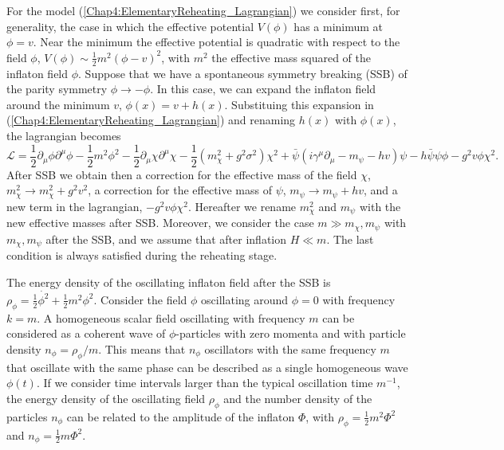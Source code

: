 \documentclass[11pt,a4paper,twoside]{book}
\begin{document}
For the model (\ref{Chap4:ElementaryReheating_Lagrangian}) we consider first, for generality, the case in which the effective potential $ V(\phi) $ has a minimum at $ \phi = v $. Near the minimum the effective potential  is quadratic with respect to the field $\phi$, $ V(\phi) \sim \frac{1}{2}m^{2}(\phi-v)^{2} $, with $ m^{2} $ the effective mass squared of the inflaton field $\phi$. Suppose that we have a spontaneous symmetry breaking (SSB) of the parity symmetry $ \phi  \rightarrow -\phi$. In this case, we can expand the inflaton field around the minimum $ v $, $ \phi(x)=v + h(x)  $. Substituing this expansion in (\ref{Chap4:ElementaryReheating_Lagrangian}) and renaming $ h(x) $ with $\phi(x)$, the lagrangian becomes
\begin{equation}
	\label{Chap4:ElementaryReheating_LafterSSB}
	\mathcal{L}=\frac{1}{2}\partial_{\mu}\phi\partial^{\mu}\phi -\frac{1}{2}m^{2}\phi^{2} - \frac{1}{2}\partial_{\mu}\chi\partial^{\mu}\chi -\frac{1}{2}(m^{2}_{\chi} +g^{2}\sigma^{2})\chi^{2} + \bar{\psi}(i\gamma^{\mu}\partial_{\mu} - m_{\psi} - hv )\psi  - h\bar{\psi}\psi\phi -g^{2}v\phi\chi^{2}.
\end{equation}
After SSB we obtain then a correction for the effective mass of the field $\chi$, $ m^{2}_{\chi} \rightarrow m^{2}_{\chi}+g^{2}v^{2} $, a correction for the effective mass of $\psi$, $ m_{\psi} \rightarrow m_{\psi} + hv $, and a new term in the lagrangian, $ -g^{2}v\phi \chi^{2} $. Hereafter we rename $ m^{2}_{\chi} $ and $ m_{\psi} $ with the new effective masses after SSB. Moreover, we consider the case $ m \gg m_{\chi}, m_{\psi} $ with $ m_{\chi},m_{\psi} $ after the SSB, and we assume that after inflation $ H \ll m $. The last condition is always satisfied during the reheating stage.

The energy density of the oscillating inflaton field after the SSB is $ \rho_{\phi} = \frac{1}{2}\dot{\phi^{2}} + \frac{1}{2}m^{2}\phi^{2}$. Consider the field $\phi$ oscillating around $\phi=0$ with frequency $ k=m $. A homogeneous scalar field oscillating with frequency $ m $ can be considered as a coherent wave of $ \phi $-particles with zero momenta and with particle density $ n_{\phi}=\rho_{\phi}/m $. This means that $ n_{\phi} $ oscillators with the same frequency $ m $ that oscillate with the same phase can be described as a single homogeneous wave $\phi(t)$. If we consider time intervals larger than the typical oscillation time $ m^{-1} $, the energy density of the oscillating field $\rho_{\phi}$ and the number density of the particles $ n_{\phi} $ can be related to the amplitude of the inflaton $\Phi$, with $\rho_{\phi}=\frac{1}{2}m^{2}\Phi^{2}$ and $ n_{\phi}=\frac{1}{2}m\Phi^{2} $.
\end{document}
